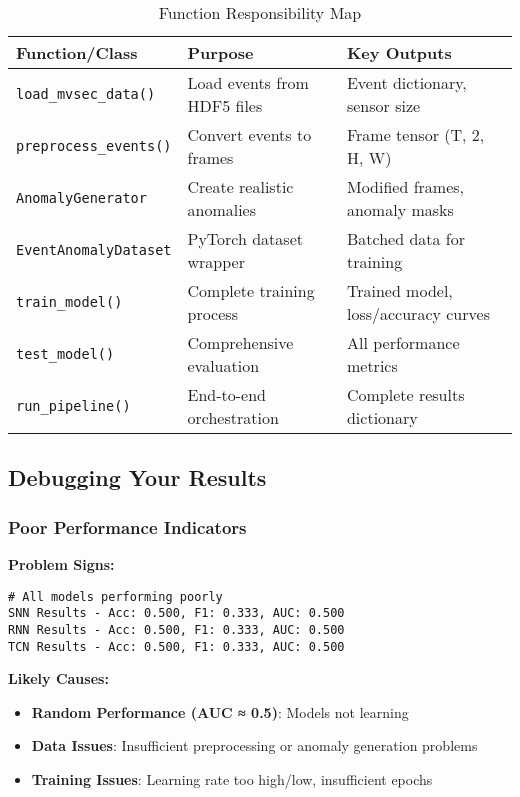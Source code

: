 \documentclass[12pt,a4paper]{article}
\begin{document}
\begin{table}[H]
\centering
\small
\begin{tabular}{|p{4cm}|p{5cm}|p{5cm}|}
\hline
\textbf{Function/Class} & \textbf{Purpose} & \textbf{Key Outputs} \\
\hline
\texttt{load\_mvsec\_data()} & Load events from HDF5 files & Event dictionary, sensor size \\
\hline
\texttt{preprocess\_events()} & Convert events to frames & Frame tensor (T, 2, H, W) \\
\hline
\texttt{AnomalyGenerator} & Create realistic anomalies & Modified frames, anomaly masks \\
\hline
\texttt{EventAnomalyDataset} & PyTorch dataset wrapper & Batched data for training \\
\hline
\texttt{train\_model()} & Complete training process & Trained model, loss/accuracy curves \\
\hline
\texttt{test\_model()} & Comprehensive evaluation & All performance metrics \\
\hline
\texttt{run\_pipeline()} & End-to-end orchestration & Complete results dictionary \\
\hline
\end{tabular}
\caption{Function Responsibility Map}
\end{table}

\subsection{Debugging Your Results}

\subsubsection{Poor Performance Indicators}

\textbf{Problem Signs:}
\begin{lstlisting}
# All models performing poorly
SNN Results - Acc: 0.500, F1: 0.333, AUC: 0.500
RNN Results - Acc: 0.500, F1: 0.333, AUC: 0.500
TCN Results - Acc: 0.500, F1: 0.333, AUC: 0.500
\end{lstlisting}

\textbf{Likely Causes:}
\begin{itemize}
    \item \textbf{Random Performance (AUC ≈ 0.5)}: Models not learning
    \item \textbf{Data Issues}: Insufficient preprocessing or anomaly generation problems
    \item \textbf{Training Issues}: Learning rate too high/low, insufficient epochs
\end{itemize}
\end{document}
